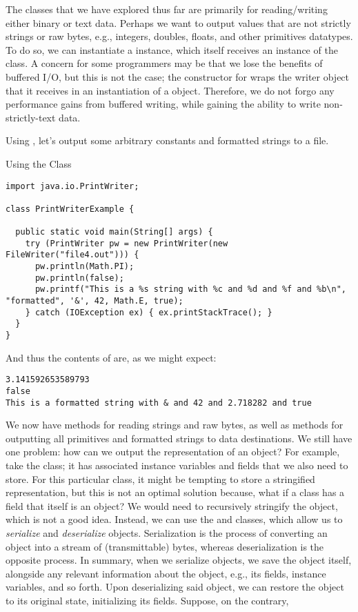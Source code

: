 The classes that we have explored thus far are primarily for reading/writing either binary or text data. Perhaps we want to output values that are not strictly strings or raw bytes, e.g., integers, doubles, floats, and other primitives datatypes. To do so, we can instantiate a  instance, which itself receives an instance of the  class. A concern for some programmers may be that we lose the benefits of buffered I/O, but this is not the case; the constructor for  wraps the writer object that it receives in an instantiation of a  object. Therefore, we do not forgo any performance gains from buffered writing, while gaining the ability to write non-strictly-text data.

\example Using , let's output some arbitrary constants and formatted strings to a file.

\begin{cl}{Using the  Class}
\begin{lstlisting}[language=MyJava]
import java.io.PrintWriter;

class PrintWriterExample {
  
  public static void main(String[] args) {
    try (PrintWriter pw = new PrintWriter(new FileWriter("file4.out"))) {
      pw.println(Math.PI);
      pw.println(false);
      pw.printf("This is a %s string with %c and %d and %f and %b\n", "formatted", '&', 42, Math.E, true);
    } catch (IOException ex) { ex.printStackTrace(); }
  }
}
\end{lstlisting}
\end{cl}

And thus the contents of  are, as we might expect:

\begin{verbatim}
3.141592653589793
false
This is a formatted string with & and 42 and 2.718282 and true
\end{verbatim}

We now have methods for reading strings and raw bytes, as well as methods for outputting all primitives and formatted strings to data destinations. We still have one problem: how can we output the representation of an object? For example, take the  class; it has associated instance variables and fields that we also need to store. For this particular class, it might be tempting to store a stringified representation, but this is not an optimal solution because, what if a class has a field that itself is an object? We would need to recursively stringify the object, which is not a good idea. Instead, we can use the  and  classes, which allow us to \textit{serialize} and \textit{deserialize} objects. Serialization is the process of converting an object into a stream of (transmittable) bytes, whereas deserialization is the opposite process. In summary, when we serialize objects, we save the object itself, alongside any relevant information about the object, e.g., its fields, instance variables, and so forth. Upon deserializing said object, we can restore the object to its original state, initializing its fields. Suppose, on the contrary,

